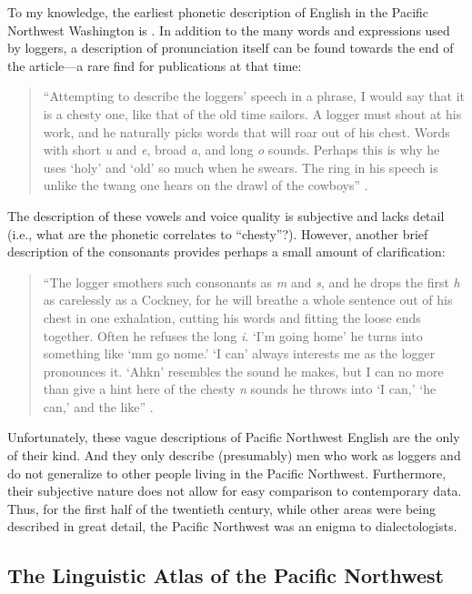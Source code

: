 To my knowledge, the earliest phonetic description of English in the Pacific Northwest Washington is \citet{stevens_1925}. In addition to the many words and expressions used by loggers, a description of pronunciation itself can be found towards the end of the article---a rare find for publications at that time:
\begin{quote}
    ``Attempting to describe the loggers' speech in a phrase, I would say that it is a chesty one, like that of the old time sailors. A logger must shout at his work, and he naturally picks words that will roar out of his chest. Words with short \textit{u} and \textit{e}, broad \textit{a}, and long \textit{o} sounds. Perhaps this is why he uses `holy' and `old' so much when he swears. The ring in his speech is unlike the twang one hears on the drawl of the cowboys'' \citep[139]{stevens_1925}.
\end{quote}
The description of these vowels and voice quality is subjective and lacks detail (i.e., what are the phonetic correlates to ``chesty''?). However, another brief description of the consonants provides perhaps a small amount of clarification:
\begin{quote}
    ``The logger smothers such consonants as \textit{m} and \textit{s}, and he drops the first \textit{h} as carelessly as a Cockney, for he will breathe a whole sentence out of his chest in one exhalation, cutting his words and fitting the loose ends together. Often he refuses the long \textit{i}. `I'm going home' he turns into something like `mm go nome.' `I can' always interests me as the logger pronounces it. `Ahkn' resembles the sound he makes, but I can no more than give a hint here of the chesty \textit{n} sounds he throws into `I can,' `he can,' and the like'' \citep[139]{stevens_1925}.
\end{quote}
Unfortunately, these vague descriptions of Pacific Northwest English are the only of their kind. And they only describe (presumably) men who work as loggers and do not generalize to other people living in the Pacific Northwest. Furthermore, their subjective nature does not allow for easy comparison to contemporary data. Thus, for the first half of the twentieth century, while other areas were being described in great detail, the Pacific Northwest was an enigma to dialectologists.

\subsection{The Linguistic Atlas of the Pacific Northwest}

